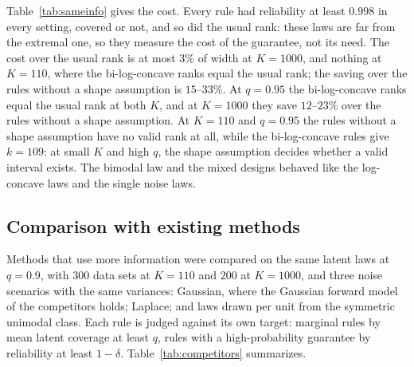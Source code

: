 \documentclass[12pt]{article}
\theoremstyle{definition}
\begin{document}
Table~\ref{tab:sameinfo} gives the cost. Every rule had reliability at least $0.998$ in every setting, covered or not, and so did the usual rank: these laws are far from the extremal one, so they measure the cost of the guarantee, not its need. The cost over the usual rank is at most $3\%$ of width at $K = 1000$, and nothing at $K = 110$, where the bi-log-concave ranks equal the usual rank; the saving over the rules without a shape assumption is $15$--$33\%$. At $q = 0.95$ the bi-log-concave ranks equal the usual rank at both $K$, and at $K = 1000$ they save $12$--$23\%$ over the rules without a shape assumption. At $K = 110$ and $q = 0.95$ the rules without a shape assumption have no valid rank at all, while the bi-log-concave rules give $k = 109$: at small $K$ and high $q$, the shape assumption decides whether a valid interval exists. The bimodal law and the mixed designs behaved like the log-concave laws and the single noise laws.

\subsection{Comparison with existing methods}\label{sec:competitors}

Methods that use more information were compared on the same latent laws at $q = 0.9$, with $300$ data sets at $K = 110$ and $200$ at $K = 1000$, and three noise scenarios with the same variances: Gaussian, where the Gaussian forward model of the competitors holds; Laplace; and laws drawn per unit from the symmetric unimodal class. Each rule is judged against its own target: marginal rules by mean latent coverage at least $q$, rules with a high-probability guarantee by reliability at least $1 - \delta$. Table~\ref{tab:competitors} summarizes.
\end{document}

